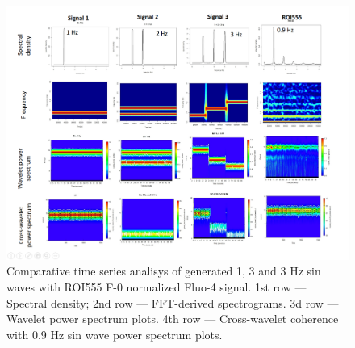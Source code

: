 \documentclass{biophys-new}
\begin{document}
\begin{figure}
    \includegraphics[width=0.9\linewidth]{fig7.png}
    \caption{Comparative time series analisys of generated 1, 3 and 3 Hz sin waves with ROI555 F-0 normalized Fluo-4 signal. 1st row --- Spectral density; 2nd row --- FFT-derived spectrograms. 3d row --- Wavelet power spectrum plots. 4th row --- Cross-wavelet coherence with 0.9 Hz sin wave power spectrum plots. }
    \label{fig:fig7}
\end{figure}

\end{document}
